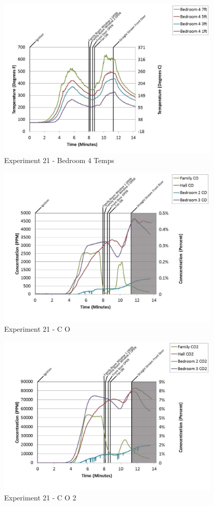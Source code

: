 \documentclass{article}
\begin{document}
\begin{appendices}
	\begin{figure}[h!]
		\centering
		\includegraphics[height=3.05in]{0_Images/Results_Charts/Exp_21_Charts/Bedroom4Temps.pdf}
		\caption{Experiment 21 - Bedroom 4 Temps}
	\end{figure}
 
	\clearpage

	\begin{figure}[h!]
		\centering
		\includegraphics[height=3.05in]{0_Images/Results_Charts/Exp_21_Charts/CO.pdf}
		\caption{Experiment 21 - C O}
	\end{figure}
 

	\begin{figure}[h!]
		\centering
		\includegraphics[height=3.05in]{0_Images/Results_Charts/Exp_21_Charts/CO2.pdf}
		\caption{Experiment 21 - C O 2}
	\end{figure}
 

\end{appendices}
\end{document}
